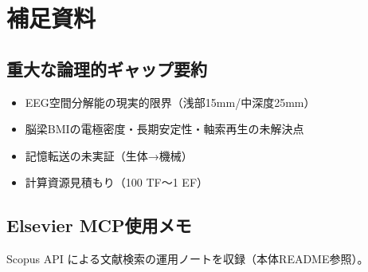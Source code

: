\appendix
\chapter{補足資料}
\section{重大な論理的ギャップ要約}
\begin{itemize}
  \item EEG空間分解能の現実的限界（浅部15mm/中深度25mm）
  \item 脳梁BMIの電極密度・長期安定性・軸索再生の未解決点
  \item 記憶転送の未実証（生体→機械）
  \item 計算資源見積もり（100 TF〜1 EF）
\end{itemize}

\section{Elsevier MCP使用メモ}
Scopus API による文献検索の運用ノートを収録（本体README参照）。



